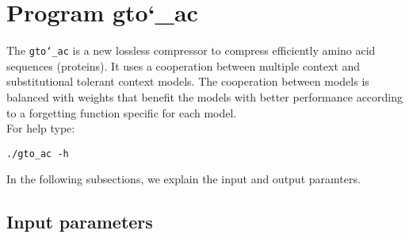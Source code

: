 \section{Program gto\char`_ac}
The \texttt{gto\char`_ac} is a new lossless compressor to compress efficiently amino acid sequences (proteins). It uses a cooperation between multiple context and substitutional tolerant context models. The cooperation between models is balanced with weights that benefit the models with better performance according to a forgetting function specific for each model.\\
For help type:
\begin{lstlisting}
./gto_ac -h
\end{lstlisting}
In the following subsections, we explain the input and output paramters.

\subsection*{Input parameters}

